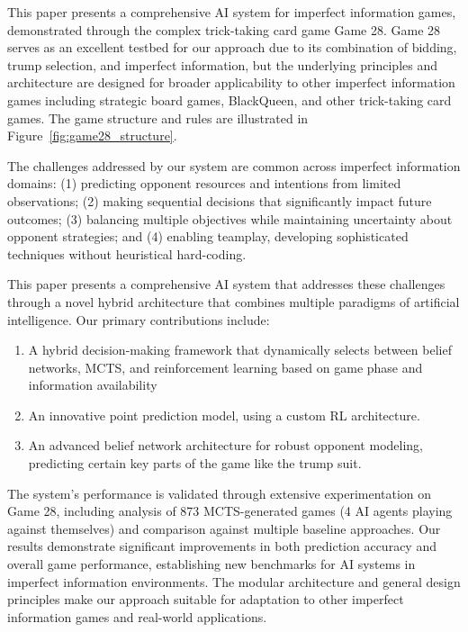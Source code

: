 \documentclass[conference]{IEEEtran}
\begin{document}
This paper presents a comprehensive AI system for imperfect information games, demonstrated through the complex trick-taking card game Game 28. Game 28 serves as an excellent testbed for our approach due to its combination of bidding, trump selection, and imperfect information, but the underlying principles and architecture are designed for broader applicability to other imperfect information games including strategic board games, BlackQueen, and other trick-taking card games. The game structure and rules are illustrated in Figure~\ref{fig:game28_structure}.

The challenges addressed by our system are common across imperfect information domains: (1) predicting opponent resources and intentions from limited observations; (2) making sequential decisions that significantly impact future outcomes; (3) balancing multiple objectives while maintaining uncertainty about opponent strategies; and (4) enabling teamplay, developing sophisticated techniques without heuristical hard-coding.

This paper presents a comprehensive AI system that addresses these challenges through a novel hybrid architecture that combines multiple paradigms of artificial intelligence. Our primary contributions include:

\begin{enumerate}
    \item A hybrid decision-making framework that dynamically selects between belief networks, MCTS, and reinforcement learning based on game phase and information availability
    \item An innovative point prediction model, using a custom RL architecture.
    \item An advanced belief network architecture for robust opponent modeling, predicting certain key parts of the game like the trump suit.
\end{enumerate}

The system's performance is validated through extensive experimentation on Game 28, including analysis of 873 MCTS-generated games (4 AI agents playing against themselves) and comparison against multiple baseline approaches. Our results demonstrate significant improvements in both prediction accuracy and overall game performance, establishing new benchmarks for AI systems in imperfect information environments. The modular architecture and general design principles make our approach suitable for adaptation to other imperfect information games and real-world applications.
\end{document}
